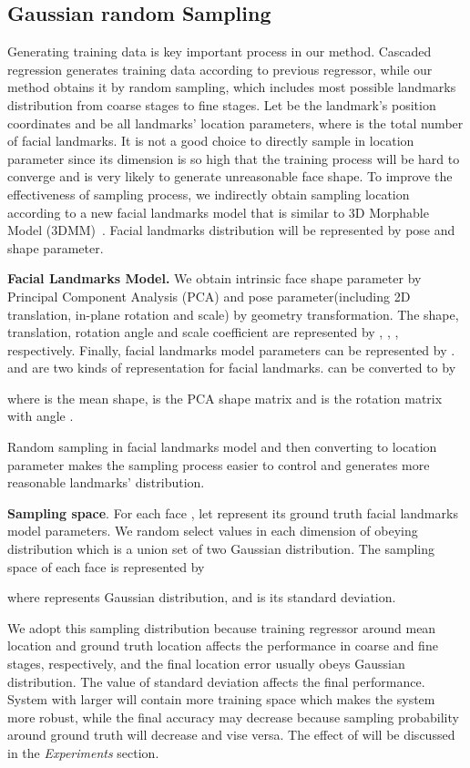 \documentclass[letterpaper]{article} \usepackage{aaai18}  \usepackage{times}  \usepackage{helvet}  \usepackage{courier}  \usepackage{url}  \usepackage{graphicx}
\begin{document}
\subsection{Gaussian random Sampling}
Generating training data is key important process in our method. Cascaded regression generates training data according to previous regressor, while our method obtains it by random sampling, which includes most possible landmarks distribution from coarse stages to fine stages. Let  be the  landmark's position coordinates and  be all landmarks' location parameters, where  is the total number of facial landmarks. It is not a good choice to directly sample in location parameter  since its dimension is so high that the training process will be hard to converge and is very likely to generate unreasonable face shape. To improve the effectiveness of sampling process, we indirectly obtain sampling location  according to a new facial landmarks model that is similar to 3D Morphable Model (3DMM)~\cite{Volker:3DMM:SIGGRAPH99}. Facial landmarks distribution will be represented by pose and shape parameter.

{\noindent \textbf{Facial Landmarks Model.}} We obtain intrinsic face shape parameter by Principal Component Analysis (PCA) and pose parameter(including 2D translation, in-plane rotation and scale) by geometry transformation. The shape, translation, rotation angle and scale coefficient are represented by , , ,  respectively. Finally, facial landmarks model parameters can be represented by .  and  are two kinds of representation for facial landmarks.  can be converted to  by

where  is the mean shape,  is the PCA shape matrix and  is the rotation matrix with angle . 

Random sampling in facial landmarks model  and then converting to location parameter  makes the sampling process easier to control and generates more reasonable landmarks' distribution. 

{\noindent \textbf{Sampling space}}. For each face , let  represent its ground truth facial landmarks model parameters. We random select values in each dimension of  obeying distribution  which is a union set of two Gaussian distribution. The sampling space of each face is represented by

where  represents Gaussian distribution, and  is its standard deviation.

We adopt this sampling distribution because training regressor around mean location and ground truth location affects the performance in coarse and fine stages, respectively, and the final location error usually obeys Gaussian distribution. The value of standard deviation  affects the final performance. System with larger  will contain more training space which makes the system more robust, while the final accuracy may decrease because sampling probability around ground truth will decrease and vise versa. The effect of  will be discussed in the \emph{Experiments} section.
\end{document}
